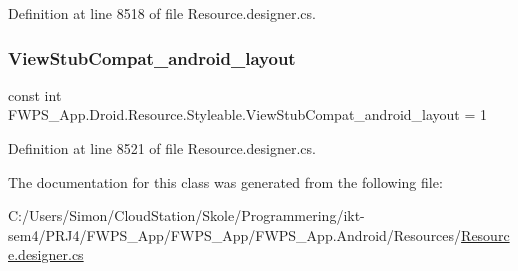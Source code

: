Definition at line 8518 of file Resource.\+designer.\+cs.

\mbox{\label{class_f_w_p_s___app_1_1_droid_1_1_resource_1_1_styleable_a9a3fef737584270c180501c8889a112d}} 
\subsubsection{\texorpdfstring{View\+Stub\+Compat\+\_\+android\+\_\+layout}{ViewStubCompat\_android\_layout}}
{\footnotesize\ttfamily const int F\+W\+P\+S\+\_\+\+App.\+Droid.\+Resource.\+Styleable.\+View\+Stub\+Compat\+\_\+android\+\_\+layout = 1}



Definition at line 8521 of file Resource.\+designer.\+cs.



The documentation for this class was generated from the following file\+:\begin{DoxyCompactItemize}
\item 
C\+:/\+Users/\+Simon/\+Cloud\+Station/\+Skole/\+Programmering/ikt-\/sem4/\+P\+R\+J4/\+F\+W\+P\+S\+\_\+\+App/\+F\+W\+P\+S\+\_\+\+App/\+F\+W\+P\+S\+\_\+\+App.\+Android/\+Resources/\mbox{\hyperlink{_resource_8designer_8cs}{Resource.\+designer.\+cs}}\end{DoxyCompactItemize}

